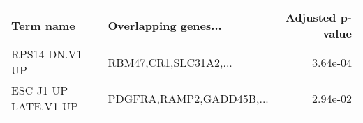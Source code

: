 \begin{tabular}{llr}
\toprule
           Term name &     Overlapping genes... &  Adjusted p-value \\
\midrule
      RPS14 DN.V1 UP &    RBM47,CR1,SLC31A2,... &          3.64e-04 \\
ESC J1 UP LATE.V1 UP & PDGFRA,RAMP2,GADD45B,... &          2.94e-02 \\
\bottomrule
\end{tabular}
